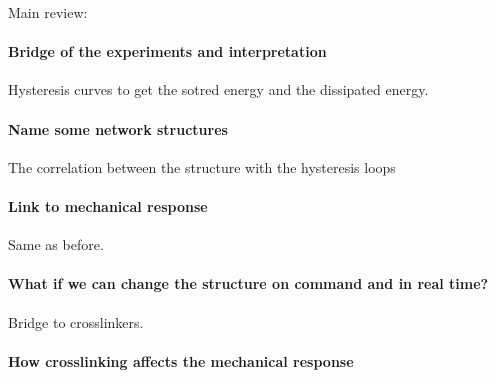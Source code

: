 Main review:\citep{guPolymerNetworksPlastics2020,sheikoArchitecturalCodeRubber2019}

\paragraph{Bridge of the experiments and interpretation} Hysteresis curves to get the sotred energy and the dissipated energy.

\paragraph{Name some network structures} The correlation between the structure with the hysteresis loops

\paragraph{Link to mechanical response} Same as before.


\paragraph{What if we can change the structure on command and in real time?} Bridge to crosslinkers.

\paragraph{How crosslinking affects the mechanical response}

\begin{comment}
These include one-step procedures like polymerization and parallel cross-linking of multifunctional monomers, as well as multiple step procedures involving synthesis of polymer molecules having reactive groups and their subsequent cross-linking, possibly also by reacting polymers with suitable cross-linking agents\citep{priyaComprehensiveReviewHydrogel2024}. 

The polymer engineer can design and synthesize polymer networks with molecular-scale control over structure such as cross-linking density and with tailored properties, such as biodegradation, mechanical strength, and chemical and biological response to stimuli\citep{priyaComprehensiveReviewHydrogel2024}.

In general, the three integral parts of the hydrogels preparation are monomer, initiator, and cross-linker. 
To control the heat of polymerization and the final hydrogels properties, diluents can be used, such as water or other aqueous solutions\citep{ahmedHydrogelPreparationCharacterization2015a}. 
Then, the hydrogel mass needs to be washed to remove impurities left from the preparation process\citep{ahmedHydrogelPreparationCharacterization2015a}. 
These include nonreacted monomer, initiators, cross-linkers, and unwanted products produced via side reactions\citep{ahmedHydrogelPreparationCharacterization2015a}.

\end{comment}


